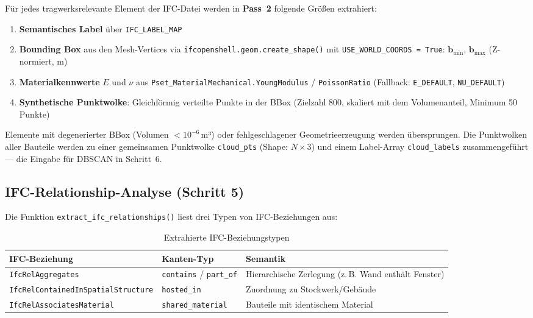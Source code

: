 \documentclass[a4paper,11pt]{article}
\begin{document}
Für jedes tragwerksrelevante Element der IFC-Datei werden in \textbf{Pass~2} folgende Größen extrahiert:

\begin{enumerate}[noitemsep]
  \item \textbf{Semantisches Label} über \texttt{IFC\_LABEL\_MAP}
  \item \textbf{Bounding Box} aus den Mesh-Vertices via \texttt{ifcopenshell.geom.create\_shape()} mit \texttt{USE\_WORLD\_COORDS = True}: $\mathbf{b}_\text{min}$, $\mathbf{b}_\text{max}$ (Z-normiert, m)
  \item \textbf{Materialkennwerte} $E$ und $\nu$ aus \texttt{Pset\_MaterialMechanical.YoungModulus} / \texttt{PoissonRatio} (Fallback: \texttt{E\_DEFAULT}, \texttt{NU\_DEFAULT})
  \item \textbf{Synthetische Punktwolke}: Gleichförmig verteilte Punkte in der BBox (Zielzahl 800, skaliert mit dem Volumenanteil, Minimum 50 Punkte)
\end{enumerate}

Elemente mit degenerierter BBox (Volumen $< 10^{-6}$\,m³) oder fehlgeschlagener Geometrieerzeugung werden übersprungen. Die Punktwolken aller Bauteile werden zu einer gemeinsamen Punktwolke \texttt{cloud\_pts} (Shape: $N \times 3$) und einem Label-Array \texttt{cloud\_labels} zusammengeführt — die Eingabe für DBSCAN in Schritt~6.

\subsection{IFC-Relationship-Analyse (Schritt 5)}

Die Funktion \texttt{extract\_ifc\_relationships()} liest drei Typen von IFC-Beziehungen aus:

\begin{table}[H]
\centering
\caption{Extrahierte IFC-Beziehungstypen}
\begin{tabular}{lll}
\toprule
\textbf{IFC-Beziehung} & \textbf{Kanten-Typ} & \textbf{Semantik} \\
\midrule
\texttt{IfcRelAggregates} & \texttt{contains} / \texttt{part\_of} & Hierarchische Zerlegung (z.\,B. Wand enthält Fenster) \\
\texttt{IfcRelContainedInSpatialStructure} & \texttt{hosted\_in} & Zuordnung zu Stockwerk/Gebäude \\
\texttt{IfcRelAssociatesMaterial} & \texttt{shared\_material} & Bauteile mit identischem Material \\
\bottomrule
\end{tabular}
\end{table}
\end{document}
